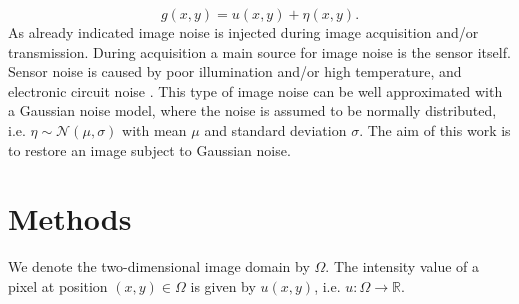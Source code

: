 \documentclass{paper}
\begin{document}
\begin{equation}
g(x,y) = u(x,y) + \eta(x,y).
\label{eq:denoisingModel}
\end{equation}
As already indicated image noise is injected during image acquisition and/or transmission. During acquisition a main source for image noise is the sensor itself. Sensor noise is caused by poor illumination and/or high temperature, and electronic circuit noise \cite{cattin13}. This type of image noise can be well approximated with a Gaussian noise model, where the noise is assumed to be normally distributed, i.e. \begin{math}\eta\sim\mathcal{N}(\mu,\sigma)\end{math} with mean \begin{math}\mu\end{math} and standard deviation \begin{math}\sigma\end{math}. The aim of this work is to restore an image subject to Gaussian noise. 



\section{Methods}
We denote the two-dimensional image domain by \begin{math}\Omega\end{math}. The intensity value of a pixel at position \begin{math}(x,y)\in\Omega\end{math} is given by \begin{math}u(x,y)\end{math}, i.e. \begin{math}u:\Omega\rightarrow\mathbb{R}\end{math}.
\end{document}
